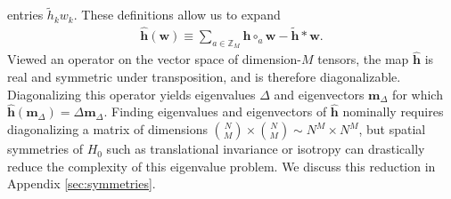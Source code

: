 \documentclass[nofootinbib,notitlepage,11pt]{revtex4-2}
\newcommand{\p}[1]{\left(#1\right)} %
\newcommand{\m}{\bm} %
\newcommand{\1}{\mathds{1}}
\newcommand{\ZZ}{\mathbb{Z}}
\begin{document}
entries $\tilde h_k w_k$.  These definitions allow us to expand
\begin{align}
  \hat{\m h}\p{\m w}
  \equiv \sum_{a\in\ZZ_M} \m h \circ_a \m w - \tilde{\m h} * \m w.
  \label{eq:multi_body_eig_op}
\end{align}
Viewed an operator on the vector space of dimension-$M$ tensors, the
map $\hat{\m h}$ is real and symmetric under transposition, and is
therefore diagonalizable.  Diagonalizing this operator yields
eigenvalues $\Delta$ and eigenvectors $\m m_\Delta$ for which
$\hat{\m h}\p{\m m_\Delta}=\Delta\m m_\Delta$.  Finding eigenvalues
and eigenvectors of $\hat{\m h}$ nominally requires diagonalizing a
matrix of dimensions
${N\choose M}\times{N\choose M}\sim N^M\times N^M$, but spatial
symmetries of $H_0$ such as translational invariance or isotropy can
drastically reduce the complexity of this eigenvalue problem.  We
discuss this reduction in Appendix \ref{sec:symmetries}.
\end{document}
